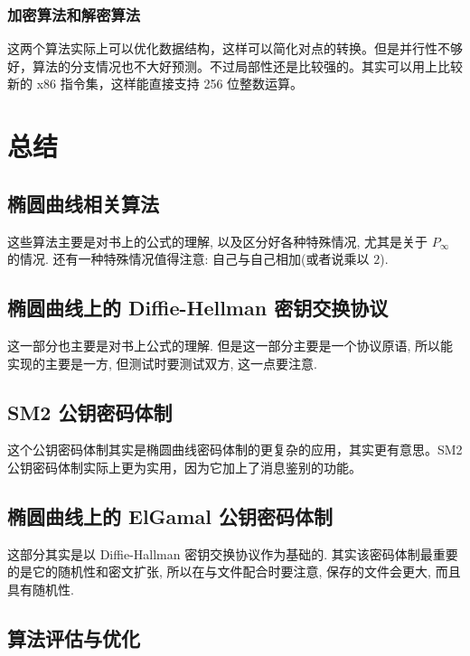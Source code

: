 \documentclass[12pt,a4paper]{article}
\begin{document}
\subsubsection*{加密算法和解密算法}

这两个算法实际上可以优化数据结构，这样可以简化对点的转换。但是并行性不够好，算法的分支情况也不大好预测。不过局部性还是比较强的。其实可以用上比较新的 x86 指令集，这样能直接支持 256 位整数运算。

\section*{总结}

\subsection*{椭圆曲线相关算法}

这些算法主要是对书上的公式的理解, 以及区分好各种特殊情况, 尤其是关于 $ P_{\infty} $ 的情况. 还有一种特殊情况值得注意: 自己与自己相加(或者说乘以 $ 2 $). 

\subsection*{椭圆曲线上的 Diffie-Hellman 密钥交换协议}

这一部分也主要是对书上公式的理解. 但是这一部分主要是一个协议原语, 所以能实现的主要是一方, 但测试时要测试双方, 这一点要注意. 

\subsection*{SM2 公钥密码体制}

这个公钥密码体制其实是椭圆曲线密码体制的更复杂的应用，其实更有意思。SM2 公钥密码体制实际上更为实用，因为它加上了消息鉴别的功能。

\subsection*{椭圆曲线上的 ElGamal 公钥密码体制}

这部分其实是以 Diffie-Hallman 密钥交换协议作为基础的. 其实该密码体制最重要的是它的随机性和密文扩张, 所以在与文件配合时要注意, 保存的文件会更大, 而且具有随机性. 

\subsection*{算法评估与优化}
\end{document}
